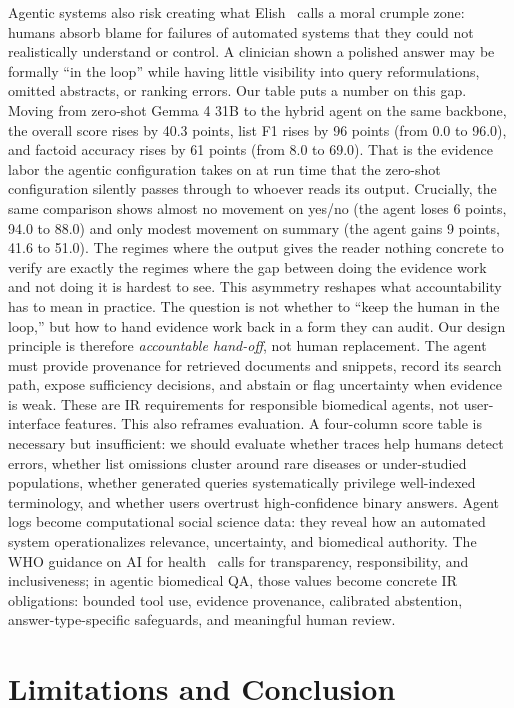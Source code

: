 \documentclass[sigconf,anonymous,review]{acmart}
\begin{document}
Agentic systems also risk creating what Elish~\cite{elish2019moral} calls a moral
crumple zone: humans absorb blame for failures of automated systems that they could not realistically understand or control. A
clinician shown a polished answer may be formally ``in the loop''
while having little visibility into query reformulations, omitted
abstracts, or ranking errors. Our table puts a number on this gap.
Moving from zero-shot Gemma 4 31B to the hybrid agent on the
same backbone, the overall score rises by 40.3 points, list F1 rises
by 96 points (from 0.0 to 96.0), and factoid accuracy rises by 61
points (from 8.0 to 69.0). That is the evidence labor the agentic
configuration takes on at run time that the zero-shot configuration
silently passes through to whoever reads its output. Crucially, the
same comparison shows almost no movement on yes/no (the agent
loses 6 points, 94.0 to 88.0) and only modest movement on summary
(the agent gains 9 points, 41.6 to 51.0). The regimes where
the output gives the reader nothing concrete to verify are exactly
the regimes where the gap between doing the evidence work and
not doing it is hardest to see. This asymmetry reshapes what accountability has to mean in practice. The question is not whether
to ``keep the human in the loop,'' but how to hand evidence work
back in a form they can audit. Our design principle is therefore
\emph{accountable hand-off}, not human replacement. The agent must
provide provenance for retrieved documents and snippets, record
its search path, expose sufficiency decisions, and abstain or flag
uncertainty when evidence is weak. These are IR requirements
for responsible biomedical agents, not user-interface features. This
also reframes evaluation. A four-column score table is necessary
but insufficient: we should evaluate whether traces help humans
detect errors, whether list omissions cluster around rare diseases
or under-studied populations, whether generated queries systematically privilege well-indexed terminology, and whether users overtrust high-confidence binary answers. Agent logs become computational social science data: they reveal how an automated system
operationalizes relevance, uncertainty, and biomedical authority.
The WHO guidance on AI for health~\cite{who2021ethics} calls for transparency,
responsibility, and inclusiveness; in agentic biomedical QA, those
values become concrete IR obligations: bounded tool use, evidence
provenance, calibrated abstention, answer-type-specific safeguards,
and meaningful human review.

\section{Limitations and Conclusion}
\end{document}
